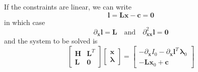 \documentclass[10pt,a4paper]{book}
\newcommand{\p}{\partial}
\begin{document}
If the constraints are linear, we can write
\[
\bm{l}=\bm{L} \bm{x} -\bm{c}=\bm{0}
\]
in which case 
\[
\p_{\bm{x}} \bm{l} = \bm{L} \quad \text{and} \quad \p^2_{\bm{x} \bm{x}} \bm{l}= \bm{0}
\]
and the system to be solved is
\[
\left [ \begin{array}{cc}
\bm{H} & \bm{L}^T  \\
\bm{L} & \bm{0} 
\end{array} \right ]
\left [ \begin{array}{c}
\bm{x} \\
\bm{\lambda}
\end{array} \right ]
=\left [ \begin{array}{c}
-\p_{\bm{x}} I_0 - \p_{\bm{x}} \bm{l}^T \, \bm{\lambda}_0 \\
-\bm{L} \bm{x}_0 + \bm{c}
\end{array} \right ]
\]
\end{document}
